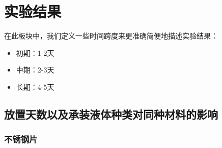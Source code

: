\documentclass[12pt,a4paper]{ctexart}
\begin{document}
\section{实验结果}
在此板块中，我们定义一些时间跨度来更准确简便地描述实验结果：
\begin{itemize}
    \item 初期：1-2天
    \item 中期：2-3天
    \item 长期：4-5天
\end{itemize}
\subsection{放置天数以及承装液体种类对同种材料的影响}
\subsubsection{不锈钢片}
\end{document}
